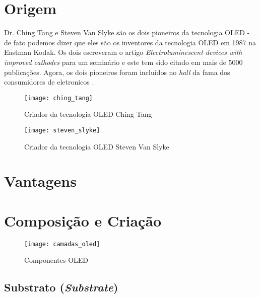 \section{Origem}
\label{sec:camadas}

Dr. Ching Tang e Steven Van Slyke são os dois pioneiros da tecnologia OLED - de fato podemos dizer que eles são os inventores da tecnologia OLED em 1987 na Eastman Kodak. Os dois escreveram o artigo \textit{Electroluminescent devices with improved cathodes} para um seminário e este tem sido citado em mais de 5000 publicações. Agora, os dois pioneiros foram incluidos no \textit{hall} da fama dos consumidores de eletronicos \cite{OLEDPioneers}. 

\begin{figure}[!h]
  \centering
  \texttt{[image: ching\_tang]} 
  \caption{Criador da tecnologia OLED Ching Tang}
  \label{fig:ching_tang} 
\end{figure}

\begin{figure}[!h]
  \centering
  \texttt{[image: steven\_slyke]} 
  \caption{Criador da tecnologia OLED Steven Van Slyke}
  \label{fig:steven_slyke} 
\end{figure}


\section{Vantagens}
\label{sec:vantagens}


\section{Composição e Criação}
\label{sec:camadas}

\begin{figure}[!h]
  \centering
  \texttt{[image: camadas\_oled]} 
  \caption{Componentes OLED}
  \label{fig:camadas_oled} 
\end{figure}


\subsection{Substrato (\textit{Substrate})}
\label{sec:substrato}

